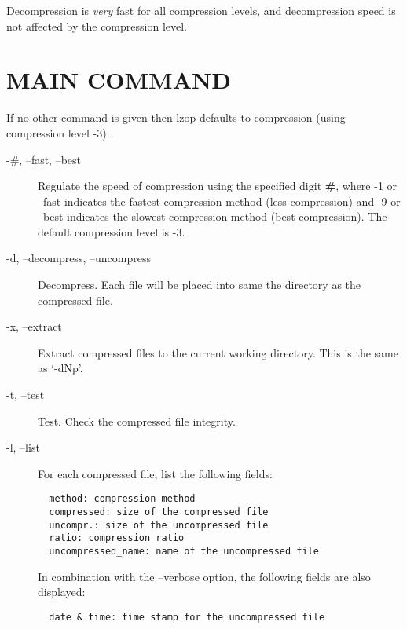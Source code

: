 Decompression is \textit{very} fast for all compression levels,
and decompression speed is not affected by the compression
level.

\section{MAIN COMMAND\label{MAIN_COMMAND}}


If no other command is given then lzop defaults to compression
(using compression level -3).

\begin{description}

\item[-\#, --fast, --best] \mbox{}

Regulate the speed of compression using the specified
digit \textbf{\#}, where -1 or --fast indicates the
fastest compression method (less compression) and
-9 or --best indicates the slowest compression
method (best compression). The default compression
level is -3.


\item[-d, --decompress, --uncompress] \mbox{}

Decompress. Each file will be placed into
same the directory as the compressed file.


\item[-x, --extract] \mbox{}

Extract compressed files to the current working
directory. This is the same as `-dNp'.


\item[-t, --test] \mbox{}

Test. Check the compressed file integrity.


\item[-l, --list] \mbox{}

For each compressed file, list the following
fields:

\begin{verbatim}
  method: compression method
  compressed: size of the compressed file
  uncompr.: size of the uncompressed file
  ratio: compression ratio
  uncompressed_name: name of the uncompressed file
\end{verbatim}


In combination with the --verbose option, the following
fields are also displayed:

\begin{verbatim}
  date & time: time stamp for the uncompressed file
\end{verbatim}



\end{description}
